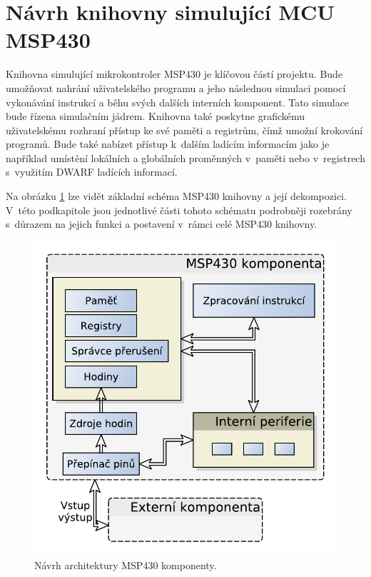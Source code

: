 \section{Návrh knihovny simulující MCU MSP430}

Knihovna simulující mikrokontroler MSP430 je klíčovou částí projektu. Bude umožňovat nahrání uživatelského programu a jeho
následnou simulaci pomocí vykonávání instrukcí a běhu svých dalších interních komponent. Tato simulace bude řízena simulačním jádrem. Knihovna také poskytne grafickému uživatelskému rozhraní přístup ke své paměti a registrům, čímž umožní krokování programů. Bude také nabízet přístup k~dalším ladícím informacím jako je například umístění lokálních a globálních proměnných v~paměti nebo v~registrech s~využitím DWARF ladících informací.

Na obrázku \ref{fig:msp430_arch} lze vidět základní schéma MSP430 knihovny a její dekompozici. V~této podkapitole jsou jednotlivé části tohoto schématu podrobněji rozebrány s~důrazem na jejich funkci a postavení v~rámci celé MSP430 knihovny.

\begin{figure}[ht]
\centering
\includegraphics[trim=0cm 0cm 0cm 0cm, scale=0.7]{fig/msp430_arch}
\caption{Návrh architektury MSP430 komponenty.}
\label{fig:msp430_arch}
\end{figure}

